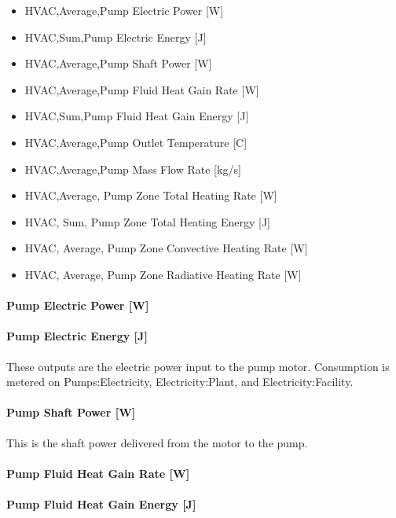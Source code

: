 \begin{itemize}
\item
  HVAC,Average,Pump Electric Power {[}W{]}
\item
  HVAC,Sum,Pump Electric Energy {[}J{]}
\item
  HVAC,Average,Pump Shaft Power {[}W{]}
\item
  HVAC,Average,Pump Fluid Heat Gain Rate {[}W{]}
\item
  HVAC,Sum,Pump Fluid Heat Gain Energy {[}J{]}
\item
  HVAC,Average,Pump Outlet Temperature {[}C{]}
\item
  HVAC,Average,Pump Mass Flow Rate {[}kg/s{]}
\item
  HVAC,Average, Pump Zone Total Heating Rate {[}W{]}
\item
  HVAC, Sum, Pump Zone Total Heating Energy {[}J{]}
\item
  HVAC, Average, Pump Zone Convective Heating Rate {[}W{]}
\item
  HVAC, Average, Pump Zone Radiative Heating Rate {[}W{]}
\end{itemize}

\paragraph{Pump Electric Power {[}W{]}}\label{pump-electric-power-w-2}

\paragraph{Pump Electric Energy {[}J{]}}\label{pump-electric-energy-j-2}

These outputs are the electric power input to the pump motor. Consumption is metered on Pumps:Electricity, Electricity:Plant, and Electricity:Facility.

\paragraph{Pump Shaft Power {[}W{]}}\label{pump-shaft-power-w-2}

This is the shaft power delivered from the motor to the pump.

\paragraph{Pump Fluid Heat Gain Rate {[}W{]}}\label{pump-fluid-heat-gain-rate-w-2}

\paragraph{Pump Fluid Heat Gain Energy {[}J{]}}\label{pump-fluid-heat-gain-energy-j-2}

